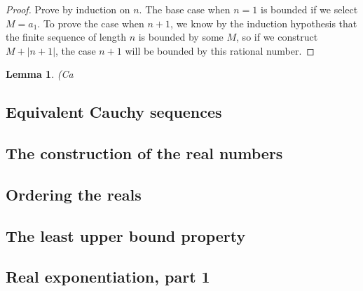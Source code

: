 \documentclass[12pt]{article}
\newtheorem{lemma}[theorem]{Lemma}
\theoremstyle{definition}
\theoremstyle{remark}
\begin{document}
\begin{proof}
    Prove by induction on $n$. The base case when $n = 1$ is bounded if we select $M = a_1$. To prove the case when $n + 1$, we know by the induction hypothesis that the finite sequence of length $n$ is bounded by some $M$, so if we construct $M + |n+1|$, the case $n+1$ will be bounded by this rational number.
\end{proof}

\begin{lemma}
    (Ca
\end{lemma}

\subsection{Equivalent Cauchy sequences}
\subsection{The construction of the real numbers}
\subsection{Ordering the reals}
\subsection{The least upper bound property}
\subsection{Real exponentiation, part 1}
\end{document}
